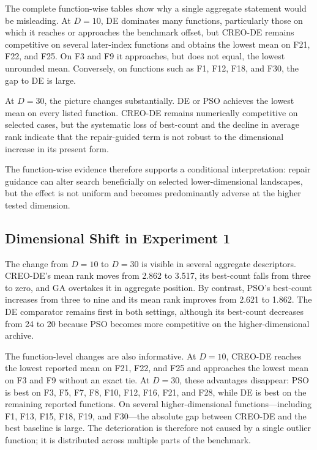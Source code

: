 \documentclass[a4paper,fleqn]{cas-sc}
\begin{document}
The complete function-wise tables show why a single aggregate statement would be misleading. At $D=10$, DE dominates many functions, particularly those on which it reaches or approaches the benchmark offset, but CREO-DE remains competitive on several later-index functions and obtains the lowest mean on F21, F22, and F25. On F3 and F9 it approaches, but does not equal, the lowest unrounded mean. Conversely, on functions such as F1, F12, F18, and F30, the gap to DE is large.

At $D=30$, the picture changes substantially. DE or PSO achieves the lowest mean on every listed function. CREO-DE remains numerically competitive on selected cases, but the systematic loss of best-count and the decline in average rank indicate that the repair-guided term is not robust to the dimensional increase in its present form.

The function-wise evidence therefore supports a conditional interpretation: repair guidance can alter search beneficially on selected lower-dimensional landscapes, but the effect is not uniform and becomes predominantly adverse at the higher tested dimension.

\subsection{Dimensional Shift in Experiment 1}

The change from $D=10$ to $D=30$ is visible in several aggregate descriptors. CREO-DE's mean rank moves from 2.862 to 3.517, its best-count falls from three to zero, and GA overtakes it in aggregate position. By contrast, PSO's best-count increases from three to nine and its mean rank improves from 2.621 to 1.862. The DE comparator remains first in both settings, although its best-count decreases from 24 to 20 because PSO becomes more competitive on the higher-dimensional archive.

The function-level changes are also informative. At $D=10$, CREO-DE reaches the lowest reported mean on F21, F22, and F25 and approaches the lowest mean on F3 and F9 without an exact tie. At $D=30$, these advantages disappear: PSO is best on F3, F5, F7, F8, F10, F12, F16, F21, and F28, while DE is best on the remaining reported functions. On several higher-dimensional functions---including F1, F13, F15, F18, F19, and F30---the absolute gap between CREO-DE and the best baseline is large. The deterioration is therefore not caused by a single outlier function; it is distributed across multiple parts of the benchmark.
\end{document}

